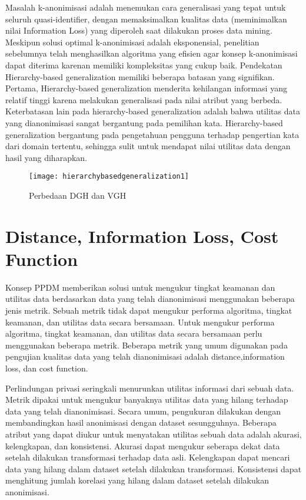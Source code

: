 \par Masalah k-anonimisasi adalah menemukan cara generalisasi yang tepat untuk seluruh quasi-identifier, dengan memaksimalkan kualitas data (meminimalkan nilai Information Loss) yang diperoleh saat dilakukan proses data mining. Meskipun solusi optimal k-anonimisasi adalah eksponensial, penelitian sebelumnya telah menghasilkan algoritma yang efisien agar konsep k-anonimisasi dapat diterima karenan memiliki kompleksitas yang cukup baik. Pendekatan Hierarchy-based generalization memiliki beberapa batasan yang signifikan. Pertama, Hierarchy-based generalization menderita kehilangan informasi yang relatif tinggi karena melakukan generalisasi pada nilai atribut yang berbeda. Keterbatasan lain pada hierarchy-based generalization adalah bahwa utilitas data yang dianonimisasi sangat bergantung pada pemilihan kata. Hierarchy-based generalization bergantung pada pengetahuan pengguna terhadap pengertian kata dari domain tertentu, sehingga sulit untuk mendapat nilai utilitas data dengan hasil yang diharapkan.
\\
\begin{figure}[H]
	\centering
	\texttt{[image: hierarchybasedgeneralization1]}
	\caption{Perbedaan DGH dan VGH}
	\label{fig:hierarchybasedgeneralization1}
\end{figure} 

\section{Distance, Information Loss, Cost Function} 
Konsep PPDM memberikan solusi untuk mengukur tingkat keamanan dan utilitas data berdasarkan data yang telah dianonimisasi menggunakan beberapa jenis metrik. Sebuah metrik tidak dapat mengukur performa algoritma, tingkat keamanan, dan utilitas data secara bersamaan. Untuk mengukur performa algoritma, tingkat keamanan, dan utilitas data secara bersamaan perlu menggunakan beberapa metrik. Beberapa metrik yang umum digunakan pada pengujian kualitas data yang telah dianonimisasi adalah distance,information loss, dan cost function.

\par Perlindungan privasi seringkali menurunkan utilitas informasi dari sebuah data. Metrik dipakai untuk mengukur banyaknya utilitas data yang hilang terhadap data yang telah dianonimisasi. Secara umum, pengukuran dilakukan dengan membandingkan hasil anonimisasi dengan dataset sesungguhnya. Beberapa atribut yang dapat diukur untuk menyatakan utilitas sebuah data adalah akurasi, kelengkapan, dan konsistensi. Akurasi dapat mengukur seberapa dekat data setelah dilakukan transformasi terhadap data asli. Kelengkapan dapat mencari data yang hilang dalam dataset setelah dilakukan transformasi. Konsistensi dapat menghitung jumlah korelasi yang hilang dalam dataset setelah dilakukan anonimisasi.


